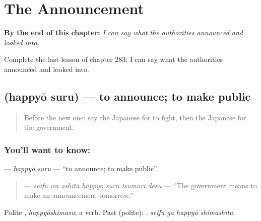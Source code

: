 
\chapter{The Announcement}
\label{ch:ja-the-announcement}

\begin{chapteropening}
\textbf{By the end of this chapter:} \emph{I can say what the authorities announced and looked into.}

Complete the last lesson of chapter 283: I can say what the authorities announced and looked into.
\end{chapteropening}

\section[\texorpdfstring{\ja{はっぴょうする} (happyō suru)}{はっぴょうする (happyō suru)}]{ (happyō suru) — to announce; to make public}

\label{lesson:JA-C283-happyou-suru}



\begin{quote}
Before the new one: say the Japanese for to fight, then the Japanese for the government.
\end{quote}

\subsection*{You'll want to know: }
\textbf{} — \emph{happyō suru} — \textquotedblleft{}to announce; to make public\textquotedblright{}.

\begin{quote}
\textbf{   } — \emph{seifu wa ashita happyō suru tsumori desu} — \textquotedblleft{}The government means to make an announcement tomorrow.\textquotedblright{}
\end{quote}

Polite \textbf{}, \emph{happyōshimasu}; a  verb. Past (polite): \textbf{ }, \emph{seifu ga happyō shimashita}.

